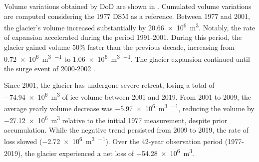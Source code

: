 Volume variations obtained by DoD are shown in .
Cumulated volume variations are computed considering the 1977 DSM as a reference.
Between 1977 and 2001, the glacier's volume increased substantially by \SI[retain-explicit-plus]{+20.66e6}{\cubic\meter}.
Notably, the rate of expansion accelerated during the period 1991-2001.
During this period, the glacier gained volume 50\% faster than the previous decade, increasing from \SI[retain-explicit-plus]{+0.72e6}{\cubic\meter\per\year} to \SI[retain-explicit-plus]{+1.06e6}{\cubic\meter\per\year}.
The glacier expansion continued until the surge event of 2000-2002 \citep{Haeberli2002, Kaab2004, Mortara2009}.

Since 2001, the glacier has undergone severe retreat, losing a total of \SI{-74.94e6}{\cubic\meter} of ice volume between 2001 and 2019.
From 2001 to 2009, the average yearly volume decrease was \SI{-5.97e6}{\cubic\meter\per\year}, reducing the volume by \SI{-27.12e6}{\cubic\meter} relative to the initial 1977 measurement, despite prior accumulation.
While the negative trend persisted from 2009 to 2019, the rate of loss slowed (\SI{-2.72e6}{\cubic\meter\per\year}).
Over the 42-year observation period (1977-2019), the glacier experienced a net loss of \SI{-54.28e6}{\cubic\meter}.

